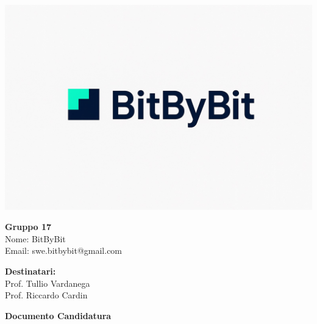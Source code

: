 \documentclass[a4paper,12pt]{article}
\begin{document}
\begin{center}
    \begin{minipage}{0.25\textwidth}
        \centering
        \includegraphics[width=\linewidth]{logo.png}
    \end{minipage}
    \hfill
    \begin{minipage}{0.7\textwidth}
        \raggedright
        {\LARGE \textbf{Gruppo 17}}\\[0.3cm]
        {\large
        Nome: BitByBit\\
        Email: swe.bitbybit@gmail.com
        }
    \end{minipage}
\end{center}

\vspace*{1cm}

\begin{flushleft}
\textbf{Destinatari:}\\
Prof. Tullio Vardanega\\
Prof. Riccardo Cardin\\
\end{flushleft}

\vspace{1cm}

\vspace{1.5cm}

\begin{center}
    {\LARGE \textbf{Documento Candidatura}}
\end{center}

\vspace*{\fill}

\clearpage

\clearpage
\tableofcontents
\thispagestyle{empty} %
\clearpage
\end{document}
